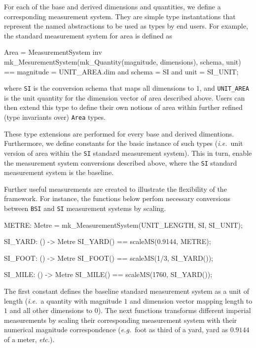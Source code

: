 \documentclass[runningheads,a4paper]{llncs}
\begin{document}
For each of the base and derived dimensions and quantities, we define a corresponding measurement system. They are simple type instantations that represent the named abstractions to be used as types by end users. For example, the standard measurement system for area is defined as 
%
\begin{vdmsl}[frame=none,basicstyle=\ttfamily\scriptsize]
  Area = MeasurementSystem
  inv mk_MesurementSystem(mk_Quantity(magnitude, dimensions), schema, unit) == 
          magnitude = UNIT_AREA.dim and schema = SI and unit = SI_UNIT;
\end{vdmsl}
%
\noindent where \texttt{SI} is the conversion schema that maps all dimensions to \(1\), and \texttt{UNIT\_AREA} is the unit quantity for the dimension vector of area described above. Users can then extend this type to define their own notions of area within further refined (type invariants over) \texttt{Area} types.

These type extensions are performed for every base and derived dimentions. Furthermore, we define constants for the basic instance of such types (\textit{i.e.}~unit version of area within the \texttt{SI} standard measurement system). This in turn, enable the measurement system conversions described above, where the \texttt{SI} standard measurement system is the baseline.   

Further useful measurements are created to illustrate the flexibility of the framework. For instance, the functions below perfom necessary conversions between \texttt{BSI} and \texttt{SI} measurement systems by scaling.   
%
\begin{vdmsl}[frame=none,basicstyle=\ttfamily\scriptsize]
    METRE: Metre = mk_MeasurementSystem(UNIT_LENGTH, SI, SI_UNIT);

    SI_YARD: () -> Metre
    SI_YARD() == scaleMS(0.9144, METRE);

    SI_FOOT: () -> Metre
    SI_FOOT() == scaleMS(1/3, SI_YARD());

    SI_MILE: () -> Metre
    SI_MILE() == scaleMS(1760, SI_YARD());
\end{vdmsl}
%
\noindent The first constant defines the baseline standard measurement system as a unit of length (\textit{i.e.}~a quantity with magnitude \(1\) and dimension vector mapping length to \(1\) and all other dimensions to \(0\)). The next functions transforms different imperial measurements by scaling their corresponding measurement system with their numerical magnitude correspondence (\textit{e.g.}~foot as third of a yard, yard as \(0.9144\) of a meter, \textit{etc.}). 
\end{document}
